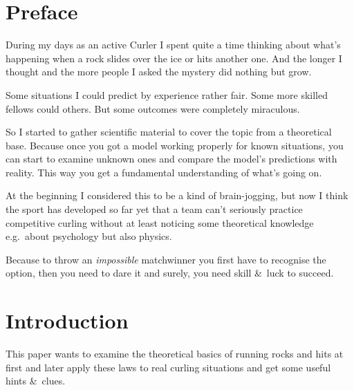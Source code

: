 \chapter*{Preface}

During my days as an active Curler I spent quite a time thinking about
what's happening when a rock slides over the ice or hits another one.
And the longer I thought and the more people I asked the mystery did
nothing but grow.

Some situations I could predict by experience rather fair. Some more
skilled fellows could others. But some outcomes were completely
miraculous.

So I started to gather scientific material to cover the topic
from a theoretical base. Because once you got a model working properly
for known situations, you can start to examine unknown ones and compare
the model's predictions with reality. This way you get a fundamental
understanding of what's going on.

At the beginning I considered this to be a kind of brain-jogging, but now I
think the sport has developed so far yet that a team can't seriously
practice competitive curling without at least noticing some theoretical
knowledge e.g.\ about psychology but also physics.

Because to throw an \emph{impossible} matchwinner you first have to
recognise the option, then you need to dare it and surely, you need skill
\&\ luck to succeed.

\chapter*{Introduction}

This paper wants to examine the theoretical basics of running rocks and hits at
first and later apply these laws to real curling situations and get some useful
hints \&\ clues.
